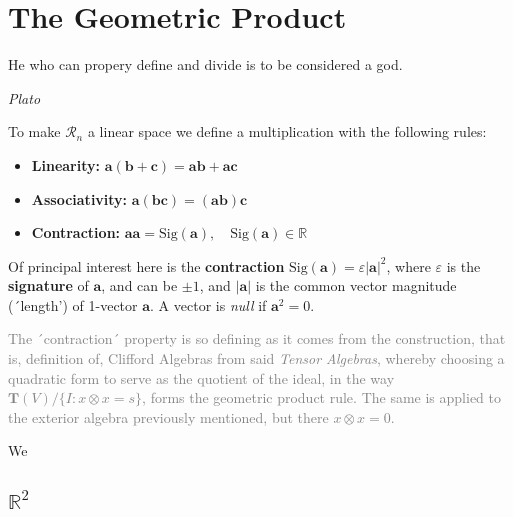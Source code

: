 \documentclass[a4paper]{book}
\numberwithin{equation}{chapter}
\begin{document}
    \section{The Geometric Product}

    \epigraph{He who can propery define and divide is to be considered a god.}{\textit{Plato}}

To make $\mathcal{R}_n$ a linear space we define a multiplication with the following rules:

\begin{tcolorbox}[colback=white, colframe = purple!60!black, title=\textbf{Geometric Product Rules} ]

\begin{itemize}
    \item \textbf{Linearity:} $\mathbf{a(b+c) = ab + ac}$
    \item \textbf{Associativity:} $\mathbf{a(bc) = (ab)c}$
    \item \textbf{Contraction:} $\mathbf{aa=} \text{Sig}(\mathbf{a}), \quad \text{Sig}(\mathbf{a})\in \mathbb{R} \label{geodef}$
\end{itemize}

\end{tcolorbox} 

Of principal interest here is the \textbf{contraction} $\text{Sig}(\mathbf{a})=\varepsilon|\mathbf{a}|^2$,
where $\varepsilon$ is the \textbf{signature} of $\mathbf{a}$, and can be $\pm 1$, 
and $|\mathbf{a}|$ is the common vector magnitude (´length') of 1-vector $\mathbf{a}$.
A vector is \emph{null} if $\mathbf{a}^2=0$. 

\textcolor{gray}{The ´contraction´ property is so defining as it comes from the construction, that is,
definition of, Clifford Algebras from said \emph{Tensor Algebras}, whereby choosing a quadratic
form to serve as the quotient of the ideal, in the way $\mathbf{T}(V)/\{I : x\otimes x = s\}$, forms
the geometric product rule. The same is applied to the exterior algebra previously mentioned, but
there $x\otimes x=0$.}

We

    \subsection{$\mathbb{R}^2$}
\end{document}
